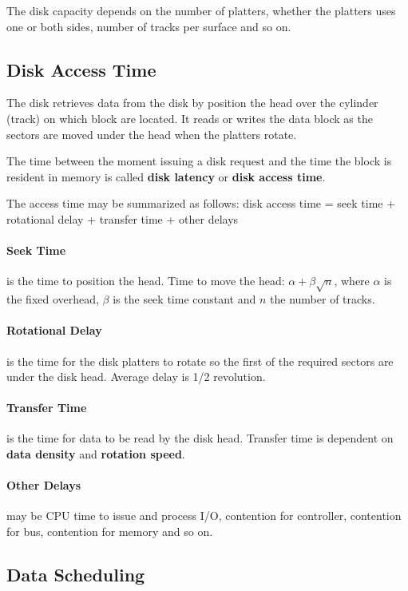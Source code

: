 \documentclass[11pt,a4paper]{article}
\begin{document}
The disk capacity depends on the number of platters, whether the platters uses one or both sides, number of tracks per surface and so on.

\subsection{Disk Access Time}
The disk retrieves data from the disk by position the head over the cylinder (track) on which block are located. It reads or writes the data block as the sectors are moved under the head when the platters rotate. 

The time between the moment issuing a disk request and the time the block is resident in memory is called \textbf{disk latency} or \textbf{disk access time}.

The access time may be summarized as follows: disk access time = seek time + rotational delay + transfer time + other delays

\paragraph{Seek Time} is the time to position the head. Time to move the head: $\alpha + \beta \sqrt{n}$, where $\alpha$ is the fixed overhead, $\beta$ is the seek time constant and $n$ the number of tracks.

\paragraph{Rotational Delay}is the time for the disk platters to rotate so the first of the required sectors are under the disk head. Average delay is 1/2 revolution.

\paragraph{Transfer Time} is the time for data to be read by the disk head. Transfer time is dependent on \textbf{data density} and \textbf{rotation speed}.

\paragraph{Other Delays} may be CPU time to issue and process I/O, contention for controller, contention for bus, contention for memory and so on.

\subsection{Data Scheduling}
\end{document}
